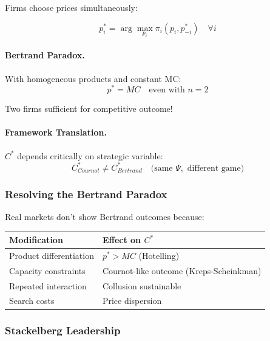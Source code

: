 Firms choose prices simultaneously:

\begin{equation}
\boxed{
p_i^* = \arg\max_{p_i} \pi_i(p_i, p_{-i}^*) \quad \forall i
}
\label{eq:bertrand}
\end{equation}

\paragraph{Bertrand Paradox.}
With homogeneous products and constant MC:
\begin{equation}
p^* = MC \quad \text{even with } n = 2
\end{equation}

Two firms sufficient for competitive outcome!

\paragraph{Framework Translation.}
$C^*$ depends critically on strategic variable:
\begin{equation}
C^*_{Cournot} \neq C^*_{Bertrand} \quad \text{(same } \Psi, \text{ different game)}
\end{equation}

\subsubsection{Resolving the Bertrand Paradox}

Real markets don't show Bertrand outcomes because:

\begin{center}
\renewcommand{\arraystretch}{1.3}
\begin{tabular}{|l|l|}
\hline
\textbf{Modification} & \textbf{Effect on $C^*$} \\
\hline
Product differentiation & $p^* > MC$ (Hotelling) \\
Capacity constraints & Cournot-like outcome (Kreps-Scheinkman) \\
Repeated interaction & Collusion sustainable \\
Search costs & Price dispersion \\
\hline
\end{tabular}
\end{center}

\subsubsection{Stackelberg Leadership}

